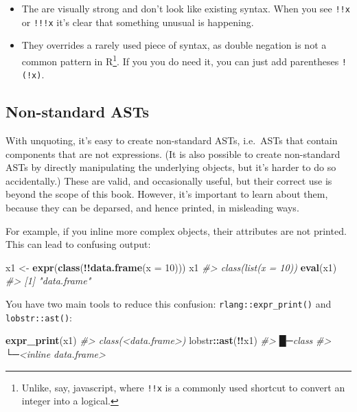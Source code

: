 \documentclass[]{book}
\newenvironment{Shaded}{\begin{snugshade}}{\end{snugshade}}
\newcommand{\CommentTok}[1]{\textcolor[rgb]{0.37,0.37,0.37}{\textit{#1}}}
\newcommand{\DataTypeTok}[1]{\textcolor[rgb]{0.27,0.27,0.27}{#1}}
\newcommand{\DecValTok}[1]{\textcolor[rgb]{0.06,0.06,0.06}{#1}}
\newcommand{\KeywordTok}[1]{\textcolor[rgb]{0.27,0.27,0.27}{\textbf{#1}}}
\newcommand{\NormalTok}[1]{#1}
\newcommand{\OperatorTok}[1]{\textcolor[rgb]{0.43,0.43,0.43}{\textbf{#1}}}
\newcommand{\StringTok}[1]{\textcolor[rgb]{0.5,0.5,0.5}{#1}}
\let\rmarkdownfootnote\footnote%
\def\footnote{\protect\rmarkdownfootnote}
\begin{document}
\begin{itemize}
\item
  The are visually strong and don't look like existing syntax. When you
  see \texttt{!!x} or \texttt{!!!x} it's clear that something unusual is happening.
\item
  They overrides a rarely used piece of syntax, as double negation is not a
  common pattern in R\footnote{Unlike, say, javascript, where \texttt{!!x} is a commonly used shortcut to convert an integer into a logical.}. If you you do need it, you can just
  add parentheses \texttt{!(!x)}.
\end{itemize}

\hypertarget{non-standard-ast}{%
\subsection{Non-standard ASTs}\label{non-standard-ast}}


With unquoting, it's easy to create non-standard ASTs, i.e.~ASTs that contain components that are not expressions. (It is also possible to create non-standard ASTs by directly manipulating the underlying objects, but it's harder to do so accidentally.) These are valid, and occasionally useful, but their correct use is beyond the scope of this book. However, it's important to learn about them, because they can be deparsed, and hence printed, in misleading ways.

For example, if you inline more complex objects, their attributes are not printed. This can lead to confusing output:

\begin{Shaded}
\begin{Highlighting}[]
\NormalTok{x1 <-}\StringTok{ }\KeywordTok{expr}\NormalTok{(}\KeywordTok{class}\NormalTok{(}\OperatorTok{!!}\KeywordTok{data.frame}\NormalTok{(}\DataTypeTok{x =} \DecValTok{10}\NormalTok{)))}
\NormalTok{x1}
\CommentTok{#> class(list(x = 10))}
\KeywordTok{eval}\NormalTok{(x1)}
\CommentTok{#> [1] "data.frame"}
\end{Highlighting}
\end{Shaded}

You have two main tools to reduce this confusion: \texttt{rlang::expr\_print()} and \texttt{lobstr::ast()}:

\begin{Shaded}
\begin{Highlighting}[]
\KeywordTok{expr_print}\NormalTok{(x1)}
\CommentTok{#> class(<data.frame>)}
\NormalTok{lobstr}\OperatorTok{::}\KeywordTok{ast}\NormalTok{(}\OperatorTok{!!}\NormalTok{x1)}
\CommentTok{#> █─class }
\CommentTok{#> └─<inline data.frame>}
\end{Highlighting}
\end{Shaded}
\end{document}

